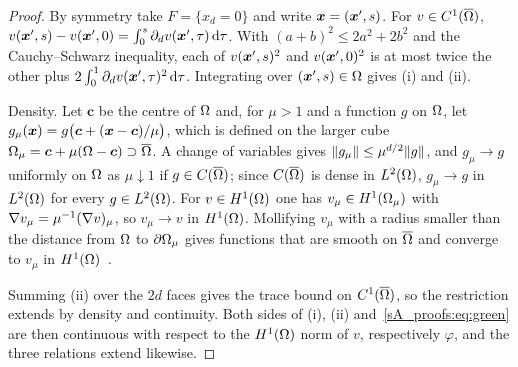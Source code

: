 \begin{proof}
By symmetry take $F=\{x_d=0\}$ and write $\boldsymbol{x}=(\boldsymbol{x}',s)$. For $v\in C^1(\overline{\Omega})$,
$v(\boldsymbol{x}',s)-v(\boldsymbol{x}',0)=\int_0^s\partial_dv(\boldsymbol{x}',\tau)\,\mathrm{d}\tau$. With $(a+b)^2\le2a^2+2b^2$ and
the Cauchy--Schwarz inequality, each of $v(\boldsymbol{x}',s)^2$ and $v(\boldsymbol{x}',0)^2$ is at most twice the
other plus $2\int_0^1\partial_dv(\boldsymbol{x}',\tau)^2\,\mathrm{d}\tau$. Integrating over $(\boldsymbol{x}',s)\in\Omega$
gives (i) and (ii).

Density. Let $\boldsymbol c$ be the centre of $\Omega$ and, for $\mu>1$ and a function $g$ on
$\Omega$, let $g_\mu(\boldsymbol{x})=g\bigl(\boldsymbol c+(\boldsymbol{x}-\boldsymbol c)/\mu\bigr)$, which is defined
on the larger cube $\Omega_\mu=\boldsymbol c+\mu(\Omega-\boldsymbol c)\supset\overline{\Omega}$. A
change of variables gives $\lVert g_\mu\rVert\le\mu^{d/2}\lVert g\rVert$, and $g_\mu\to g$ uniformly
on $\Omega$ as $\mu\downarrow1$ if $g\in C(\overline{\Omega})$; since $C(\overline{\Omega})$ is dense
in $L^2(\Omega)$, $g_\mu\to g$ in $L^2(\Omega)$ for every $g\in L^2(\Omega)$. For $v\in H^1(\Omega)$
one has $v_\mu\in H^1(\Omega_\mu)$ with $\nabla v_\mu=\mu^{-1}(\nabla v)_\mu$, so $v_\mu\to v$
in $H^1(\Omega)$. Mollifying $v_\mu$ with a radius smaller than the distance from $\Omega$ to
$\partial\Omega_\mu$ gives functions that are smooth on $\overline{\Omega}$ and converge to
$v_\mu$ in $H^1(\Omega)$~\citep[Sec.~5.3.1]{evans2010}.

Summing (ii) over the $2d$ faces gives the trace bound on $C^1(\overline{\Omega})$, so the
restriction extends by density and continuity. Both sides of (i), (ii)
and~\eqref{sA_proofs:eq:green} are then continuous with respect to the $H^1(\Omega)$ norm of
$v$, respectively $\varphi$, and the three relations extend likewise.
\end{proof}


